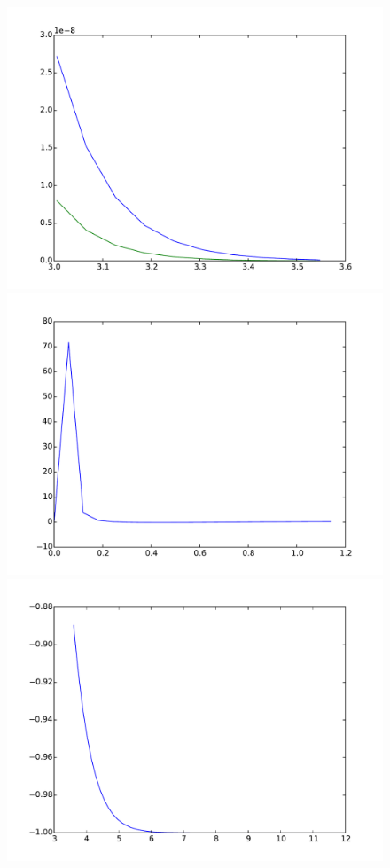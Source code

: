 \documentclass{article}
\begin{document}
\begin{figure}[htb]
\begin{minipage}{.45\textwidth}
		\includegraphics[width=0.97\linewidth]{bootstrap-filter/tail_simple_3_3.pdf}
	\end{minipage}
	\begin{minipage}{.45\textwidth}
		\centering
		\includegraphics[width=0.97\linewidth]{bootstrap-filter/relative_beginning_simple_3_3.pdf}
	\end{minipage}
	\begin{minipage}{.45\textwidth}
		\centering
		\includegraphics[width=0.97\linewidth]{bootstrap-filter/relative_tail_simple_3_3.pdf}

\end{minipage}
\end{figure}
\end{document}
